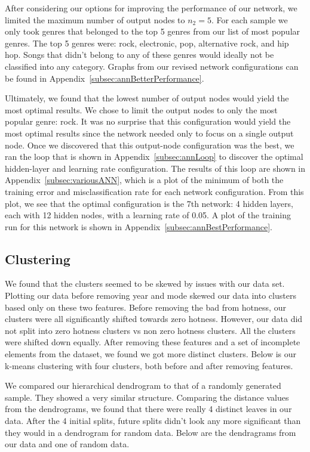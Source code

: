 \documentclass[12pt]{article}
\begin{document}
After considering our options for improving the performance of our network, we limited the maximum number of output nodes to $n_2 = 5$. For each sample we only took genres that belonged to the top 5 genres from our list of most popular genres. The top 5 genres were: rock, electronic, pop, alternative rock, and hip hop. Songs that didn't belong to any of these genres would ideally not be classified into any category. Graphs from our revised network configurations can be found in Appendix~\ref{subsec:annBetterPerformance}.

Ultimately, we found that the lowest number of output nodes would yield the most optimal results. We chose to limit the output nodes to only the most popular genre: rock. It was no surprise that this configuration would yield the most optimal results since the network needed only to focus on a single output node. Once we discovered that this output-node configuration was the best, we ran the loop that is shown in Appendix~\ref{subsec:annLoop} to discover the optimal hidden-layer and learning rate configuration. The results of this loop are shown in Appendix~\ref{subsec:variousANN}, which is a plot of the minimum of both the training error and misclassification rate for each network configuration. From this plot, we see that the optimal configuration is the 7th network: 4 hidden layers, each with 12 hidden nodes, with a learning rate of 0.05. A plot of the training run for this network is shown in Appendix~\ref{subsec:annBestPerformance}.


\subsection{Clustering}
\label{subsec:clusteringResults}
We found that the clusters seemed to be skewed by issues with our data set. Plotting our data before removing year and mode skewed our data into clusters based only on these two features. Before removing the bad from hotness, our clusters were all significantly shifted towards zero hotness. However, our data did not split into zero hotness clusters vs non zero hotness clusters. All the clusters were shifted down equally. After removing these features and a set of incomplete elements from the dataset, we found we got more distinct clusters. Below is our k-means clustering with four clusters, both before and after removing features.


We compared our hierarchical dendrogram to that of a randomly generated sample. They showed a very similar structure. Comparing the distance values from the dendrograms, we found that there were really 4 distinct leaves in our data. After the 4 initial splits, future splits didn't look any more significant than they would in a dendrogram for random data. Below are the dendragrams from our data and one of random data.
\end{document}
